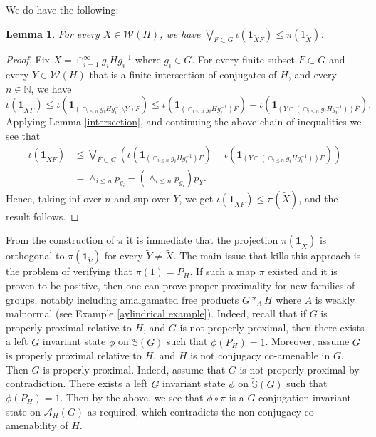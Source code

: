 \documentclass[11pt]{amsart}
\newtheorem{lem}[thm]{Lemma}
\theoremstyle{definition}
\begin{document}
We do have the following:
\begin{lem}
For every $X\in \mathcal{W}(H)$, we have $\bigvee_{F\subset G} \iota(\mathbf 1_{\widetilde{X}F})\leq \pi(1_{\widetilde{X}})$.
\end{lem}

\begin{proof}
Fix $X= \cap_{i=1}^\infty g_iHg_i^{-1}$ where $g_i\in G$. For every finite subset $F\subset G$ and every $Y\in \mathcal{W}(H)$ that is a finite intersection of conjugates of $H$, and every $n\in \mathbb{N}$, we have  $$\iota(\mathbf 1_{\widetilde{X}F})\leq   \iota(\mathbf 1_{(\cap_{i\leq n}g_iHg_i^{-1}\setminus Y )F})\leq \iota(\mathbf 1_{(\cap_{i\leq n}g_iHg_i^{-1})F}) - \iota(\mathbf 1_{(Y\cap (\cap_{i\leq n}g_iHg_i^{-1}))F}) .$$ Applying Lemma \ref{intersection}, and continuing the above chain of inequalities we see that 
\[
\begin{split}
\iota(\mathbf 1_{\widetilde{X}F})&\leq \bigvee_{F\subset G}\left(  \iota(\mathbf 1_{(\cap_{i\leq n}g_iHg_i^{-1})F}) - \iota(\mathbf 1_{(Y\cap (\cap_{i\leq n}g_iHg_i^{-1}))F})\right)
\\&= \land_{i\leq n}p_{g_i} - (\land_{i\leq n}p_{g_i})p_{Y}.
\end{split}
\]
Hence, taking inf over $n$ and sup over $Y$, we get  $\iota(\mathbf 1_{\widetilde{X}F})\leq \pi(\widetilde{X})$, and the result follows.   
\end{proof}

From the construction of $\pi$ it is immediate that the projection $\pi(\mathbf{1}_{\widetilde{X}})$ is orthogonal to $\pi(\mathbf{1}_{\widetilde{Y}})$ for every $\widetilde{Y}\neq \widetilde{X}$. The main issue that kills this approach is the problem of verifying that $\pi(1)=P_H$. If such a map $\pi$ existed and it is proven to be positive, then one can prove proper proximality for new families of groups, notably including amalgamated free products $G*_AH$ where $A$ is weakly malnormal  (see Example \ref{aylindrical example}). Indeed, recall that
if $G$ is properly proximal relative to $H$, and $G$ is not properly proximal, then there exists a left $G$ invariant state $\phi$ on $\widetilde{\mathbb{S}}(G)$ such that $\phi(P_H)=1$. Moreover, assume $G$ is properly proximal relative to $H$, and $H$ is not conjugacy co-amenable in $G$. Then $G$ is properly proximal. Indeed, assume that $G$ is not properly proximal by contradiction. There exists a left $G$ invariant state $\phi$ on $\widetilde{\mathbb{S}}(G)$ such that $\phi(P_H)=1$.   Then by the above, we see that  $\phi\circ \pi$  is a $G$-conjugation invariant state on $\mathcal{A}_H(G)$ as required, which contradicts the non conjugacy co-amenability of $H$. 





\end{document}
